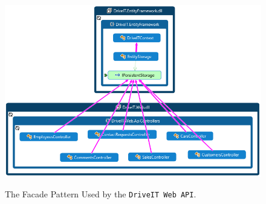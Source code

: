 \begin{figure}[H]
	\centering
	\includegraphics[scale=0.6]{Figures/FacadeKindOfPattern}\\
	\caption{The Facade Pattern Used by the \texttt{DriveIT Web API}.}
	\label{fig:The Facade Pattern Used by the DriveIT Web API.}
\end{figure}
